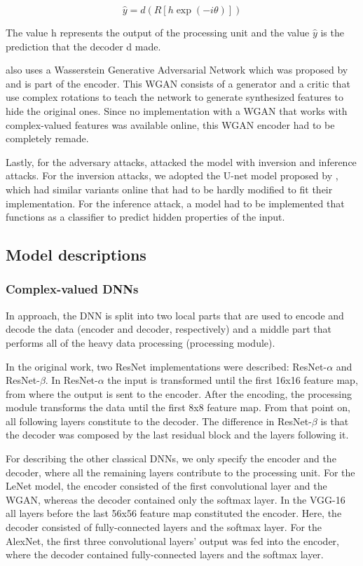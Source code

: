 \begin{equation}
    \hat{y} = d(R[h \exp(-i\theta)])
    \label{eq_decoder}
\end{equation}

The value h represents the output of the processing unit and the value $\hat{y}$ is the prediction that the decoder d made.

\citet{xiang2020interpretable} also uses a Wasserstein Generative Adversarial Network which was proposed by \citet{pmlr-v70-arjovsky17a} and is part of the encoder. This WGAN consists of a generator and a critic that use complex rotations to teach the network to generate synthesized features to hide the original ones. Since no implementation with a WGAN that works with complex-valued features was available online, this WGAN encoder had to be completely remade.

Lastly, for the adversary attacks, \citet{xiang2020interpretable} attacked the model with inversion and inference attacks. For the inversion attacks, we adopted the U-net model proposed by \citet{U-net}, which had similar variants online that had to be hardly modified to fit their implementation. For the inference attack, a model had to be implemented that functions as a classifier to predict hidden properties of the input.

\subsection{Model descriptions}
\subsubsection{Complex-valued DNNs}
In \citet{xiang2020interpretable} approach, the DNN is split into two local parts that are used to encode and decode the data (encoder and decoder, respectively) and a middle part that performs all of the heavy data processing (processing module). 

In the original work, two ResNet implementations were described: ResNet-$\alpha$ and ResNet-$\beta$. In ResNet-$\alpha$ the input is transformed until the first 16x16 feature map, from where the output is sent to the encoder. After the encoding, the processing module transforms the data until the first 8x8 feature map. From that point on, all following layers constitute to the decoder. The difference in ResNet-$\beta$ is that the decoder was composed by the last residual block and the layers following it. 

For describing the other classical DNNs, we only specify the encoder and the decoder, where all the remaining layers contribute to the processing unit. For the LeNet model, the encoder consisted of the first convolutional layer and the WGAN, whereas the decoder contained only the softmax layer. In the VGG-16 all layers before the last 56x56 feature map constituted the encoder. Here, the decoder consisted of fully-connected layers and the softmax layer. For the AlexNet, the first three convolutional layers' output was fed into the encoder, where the decoder contained fully-connected layers and the softmax layer.

